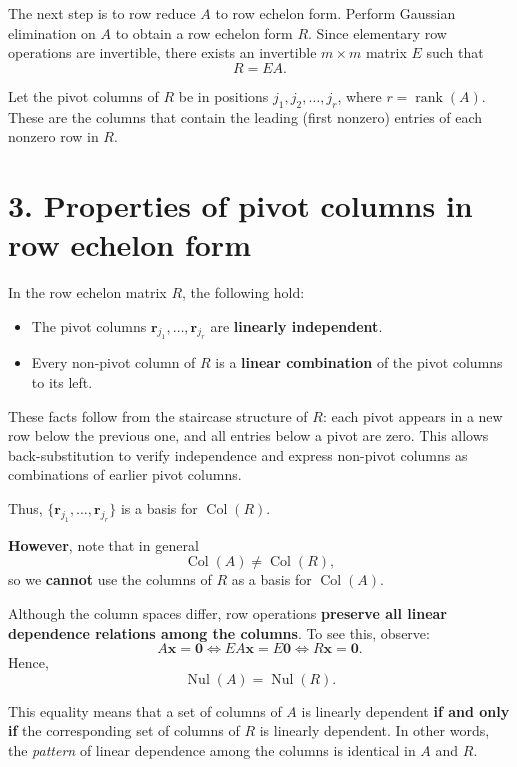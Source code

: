 \documentclass{article}
\begin{document}
The next step is to row reduce $A$ to row echelon form.
Perform Gaussian elimination on $A$ to obtain a row echelon form $R$. Since elementary row operations are invertible, there exists an invertible $m \times m$ matrix $E$ such that
\[
R = EA.
\]

Let the pivot columns of $R$ be in positions $j_1, j_2, \dots, j_r$, where $r = \operatorname{rank}(A)$. These are the columns that contain the leading (first nonzero) entries of each nonzero row in $R$.

\section*{3. Properties of pivot columns in row echelon form}

In the row echelon matrix $R$, the following hold:
\begin{itemize}
\item The pivot columns $\mathbf{r}_{j_1}, \dots, \mathbf{r}_{j_r}$ are \textbf{linearly independent}.
    \item Every non-pivot column of $R$ is a \textbf{linear combination} of the pivot columns to its left.
\end{itemize}

These facts follow from the staircase structure of $R$: each pivot appears in a new row below the previous one, and all entries below a pivot are zero. This allows back-substitution to verify independence and express non-pivot columns as combinations of earlier pivot columns.

Thus, $\{ \mathbf{r}_{j_1}, \dots, \mathbf{r}_{j_r} \}$ is a basis for $\operatorname{Col}(R)$.

\textbf{However}, note that in general
\[
\operatorname{Col}(A) \ne \operatorname{Col}(R),
\]
so we \textbf{cannot} use the columns of $R$ as a basis for $\operatorname{Col}(A)$.


Although the column spaces differ, row operations \textbf{preserve all linear dependence relations among the columns}. To see this, observe:
\[
A\mathbf{x} = \mathbf{0}
\iff
EA\mathbf{x} = E\mathbf{0}
\iff
R\mathbf{x} = \mathbf{0}.
\]
Hence,
\[
\operatorname{Nul}(A) = \operatorname{Nul}(R).
\]

This equality means that a set of columns of $A$ is linearly dependent \textbf{if and only if} the corresponding set of columns of $R$ is linearly dependent. In other words, the \textit{pattern} of linear dependence among the columns is identical in $A$ and $R$.
\end{document}
